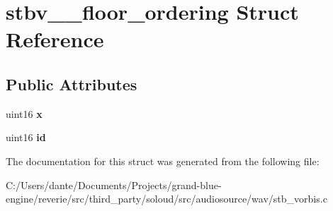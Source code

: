 \hypertarget{structstbv____floor__ordering}{}\section{stbv\+\_\+\+\_\+floor\+\_\+ordering Struct Reference}
\label{structstbv____floor__ordering}
\subsection*{Public Attributes}
\begin{DoxyCompactItemize}
\item 
\mbox{\label{structstbv____floor__ordering_ae924c7a53744c143820b8ca1f82eb591}} 
uint16 {\bfseries x}
\item 
\mbox{\label{structstbv____floor__ordering_afc029b834baf4e8b8c7b9016411006f7}} 
uint16 {\bfseries id}
\end{DoxyCompactItemize}


The documentation for this struct was generated from the following file\+:\begin{DoxyCompactItemize}
\item 
C\+:/\+Users/dante/\+Documents/\+Projects/grand-\/blue-\/engine/reverie/src/third\+\_\+party/soloud/src/audiosource/wav/stb\+\_\+vorbis.\+c\end{DoxyCompactItemize}
